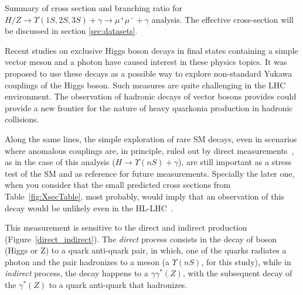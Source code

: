\begin{table}[htp]
\begin{center}

\caption{Summary of cross section and branching ratio for $H/Z \rightarrow \Upsilon(1S,2S,3S)+\gamma  \rightarrow \mu^{+} \mu^{-} +\gamma$ analysis. The effective cross-section will be discussed in section \ref{sec:datasets}.}
\label{fig:XsecTable}
\end{center}
\end{table}

 
Recent studies on exclusive Higgs boson decays \cite{ISIDORI2014131,PhysRevLett.114.101802,GAO2014366} in final states containing a simple vector meson and a photon have caused interest in these physics topics. It was proposed to use these decays as a possible way to explore non-standard Yukawa couplings of the Higgs boson. Such measures are quite challenging in the LHC environment. The observation of hadronic decays of vector bosons provides could provide a new frontier for the nature of heavy quarkonia production in hadronic collisions.

Along the same lines, the simple exploration of rare SM decays, even in scenarios where anomalous couplings are, in principle, ruled out by direct measurements~\cite{cms_h_to_bb_PhysRevLett.121.121801}, as in the case of this analysis ($H \rightarrow \Upsilon(nS) + \gamma$), are still important as a stress test of the SM and as reference for future measurements. Specially the later one, when you consider that the small predicted cross sections from Table~\ref{fig:XsecTable}, most probably, would imply that an observation of this decay would be unlikely even in the HL-LHC~\cite{hl_lhc}.

This measurement is sensitive to the direct and indirect production (Figure~\ref{direct_indirect}). The \textit{direct} process consists in the decay of boson (Higgs or Z) to a quark anti-quark pair, in which, one of the quarks radiates a photon and the pair hadronizes to a meson (a $\Upsilon(nS)$, for this study), while in \textit{indirect} process, the decay happens to a $\gamma \gamma^{*}(Z)$, with the subsequent decay of the $\gamma^{*}(Z)$ to a quark anti-quark that hadronizes. 


